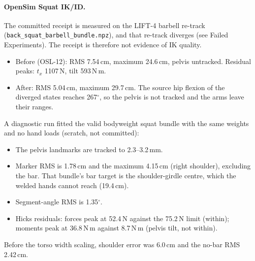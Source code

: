 \documentclass[11pt,a4paper]{article}
\begin{document}
\paragraph{OpenSim Squat IK/ID.} The committed receipt is measured on the
LIFT-4 barbell re-track (\texttt{back\_squat\_barbell\_bundle.npz}), and that
re-track diverges (see Failed Experiments). The receipt is therefore not
evidence of IK quality.
\begin{itemize}[nosep]
\item Before (OSL-12): RMS 7.54\,cm, maximum 24.6\,cm, pelvis untracked.
  Residual peaks: $t_x$ 1107\,N, tilt 593\,N\,m.
\item After: RMS 5.04\,cm, maximum 29.7\,cm. The source hip flexion of the
  diverged states reaches 267$^\circ$, so the pelvis is not tracked and the arms
  leave their ranges.
\end{itemize}

A diagnostic run fitted the valid bodyweight squat bundle with the same
weights and no hand loads (scratch, not committed):
\begin{itemize}[nosep]
\item The pelvis landmarks are tracked to 2.3--3.2\,mm.
\item Marker RMS is 1.78\,cm and the maximum 4.15\,cm (right shoulder),
  excluding the bar. That bundle's bar target is the shoulder-girdle centre,
  which the welded hands cannot reach (19.4\,cm).
\item Segment-angle RMS is 1.35$^\circ$.
\item Hicks residuals: forces peak at 52.4\,N against the 75.2\,N limit
  (within); moments peak at 36.8\,N\,m against 8.7\,N\,m (pelvis tilt, not
  within).
\end{itemize}
Before the torso width scaling, shoulder error was 6.0\,cm and the no-bar RMS
2.42\,cm.
\end{document}
